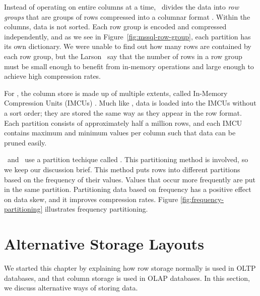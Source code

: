 Instead of operating on entire columns at a time, \mssql~divides the data into \textit{row groups} that are groups of rows compressed into a columnar format \cite{Larson2013-mc}. Within the columns, data is not sorted. Each row group is encoded and compressed independently, and as we see in Figure~\ref{fig:mssql-row-group}, each partition has its own dictionary. We were unable to find out how many rows are contained by each row group, but the Larson \ea~say that the number of rows in a row group must be small enough to benefit from in-memory operations and large enough to achieve high compression rates. 

For \oracle, the column store is made up of multiple extents, called In-Memory Compression Units (IMCUs) \cite{Lahiri2015-mz}. Much like \mssql, data is loaded into the IMCUs without a sort order; they are stored the same way as they appear in the row format. Each partition consists of approximately half a million rows, and each IMCU contains maximum and minimum values per column such that data can be pruned easily.


\blink~and \ibm~use a partition techique called  \cite{Barber2012-xt, Raman2008-gi, Raman2013-em}. This partitioning method is involved, so we keep our discussion brief. This method puts rows into different partitions based on the frequency of their values. Values that occur more frequently are put in the same partition. Partitioning data based on frequency has a positive effect on data skew, and it improves compression rates. Figure \ref{fig:frequency-partitioning} illustrates frequency partitioning.

\section{Alternative Storage Layouts}
\label{sec:Alternative Storage Layouts}
We started this chapter by explaining how row storage normally is used in OLTP databases, and that column storage is used in OLAP databases. In this section, we discuss alternative ways of storing data. 


